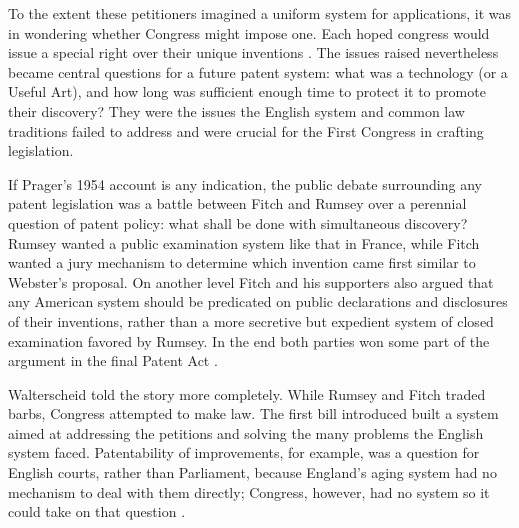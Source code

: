 \documentclass[12pt,letterpaper]{article}
\begin{document}
{To the extent these petitioners imagined a uniform system for applications, it was in wondering whether Congress might impose one. Each hoped congress would issue a special right over their unique inventions \autocite{Walterscheid1997, Prager1954}. The issues raised nevertheless became central questions for a future patent system: what was a technology (or a Useful Art), and how long was sufficient enough time to protect it to promote their discovery? They were the issues the English system and common law traditions failed to address and were crucial for the First Congress in crafting legislation.


If Prager's 1954 account is any indication, the public debate surrounding any patent legislation was a battle between Fitch and Rumsey over a perennial question of patent policy: what shall be done with simultaneous discovery? Rumsey wanted a public examination system like that in France, while Fitch wanted a jury mechanism to determine which invention came first similar to Webster's proposal. On another level Fitch and his supporters also argued that any American system should be predicated on public declarations and disclosures of their inventions, rather than a more secretive but expedient system of closed examination favored by Rumsey. In the end both parties won some part of the argument in the final Patent Act \autocite{Prager1954}.

Walterscheid told the story more completely. While Rumsey and Fitch traded barbs, Congress attempted to make law. The first bill introduced built a system aimed at addressing the petitions and solving the many problems the English system faced. Patentability of improvements, for example, was a question for English courts, rather than Parliament, because England's aging system had no mechanism to deal with them directly; Congress, however, had no system so it could take on that question \autocite{Walterscheid1997}.

}
\end{document}
